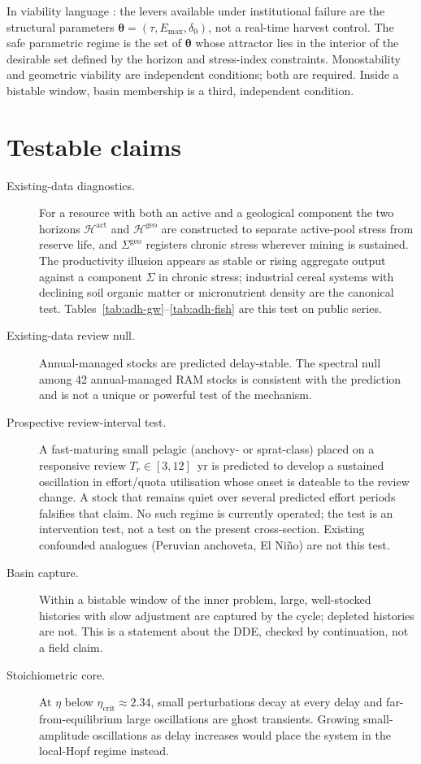 \documentclass[11pt]{article}
\theoremstyle{definition}
\begin{document}
In viability language \cite{aubin1991,cury2005}: the levers available under institutional failure are the structural parameters $\boldsymbol\theta=(\tau,E_{\max},\delta_0)$, not a real-time harvest control. The safe parametric regime is the set of $\boldsymbol\theta$ whose attractor lies in the interior of the desirable set defined by the horizon and stress-index constraints. Monostability and geometric viability are independent conditions; both are required. Inside a bistable window, basin membership is a third, independent condition.

\section{Testable claims}

\begin{description}
\item[Existing-data diagnostics.] For a resource with both an active and a geological component the two horizons $\mathcal H^{\mathrm{act}}$ and $\mathcal H^{\mathrm{geo}}$ are constructed to separate active-pool stress from reserve life, and $\Sigma^{\mathrm{geo}}$ registers chronic stress wherever mining is sustained. The productivity illusion appears as stable or rising aggregate output against a component $\Sigma$ in chronic stress; industrial cereal systems with declining soil organic matter or micronutrient density are the canonical test. Tables~\ref{tab:adh-gw}--\ref{tab:adh-fish} are this test on public series.
\item[Existing-data review null.] Annual-managed stocks are predicted delay-stable. The spectral null among 42 annual-managed RAM stocks \cite{ricard2012} is consistent with the prediction and is not a unique or powerful test of the mechanism.
\item[Prospective review-interval test.] A fast-maturing small pelagic (anchovy- or sprat-class) placed on a responsive review $T_r\in[3,12]$~yr is predicted to develop a sustained oscillation in effort/quota utilisation whose onset is dateable to the review change. A stock that remains quiet over several predicted effort periods falsifies that claim. No such regime is currently operated; the test is an intervention test, not a test on the present cross-section. Existing confounded analogues (Peruvian anchoveta, El Ni\~no) are not this test.
\item[Basin capture.] Within a bistable window of the inner problem, large, well-stocked histories with slow adjustment are captured by the cycle; depleted histories are not. This is a statement about the DDE, checked by continuation, not a field claim.
\item[Stoichiometric core.] At $\eta$ below $\eta_{\mathrm{crit}}\approx 2.34$, small perturbations decay at every delay and far-from-equilibrium large oscillations are ghost transients. Growing small-amplitude oscillations as delay increases would place the system in the local-Hopf regime instead.
\end{description}
\end{document}
